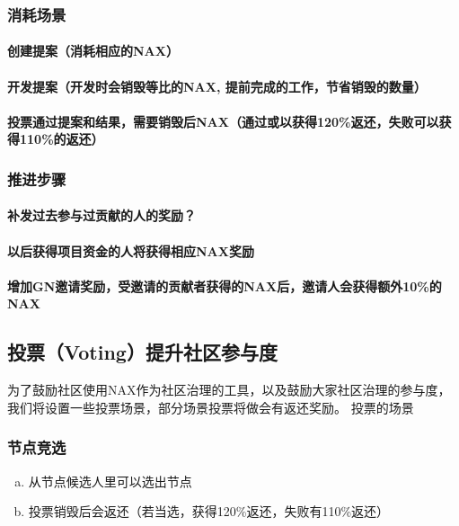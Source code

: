 \subsubsection{消耗场景}
\paragraph{创建提案（消耗相应的NAX）}
\paragraph{开发提案（开发时会销毁等比的NAX, 提前完成的工作，节省销毁的数量）}
\paragraph{投票通过提案和结果，需要销毁后NAX（通过或以获得120\%返还，失败可以获得110\%的返还）}

\subsubsection{推进步骤}
\paragraph{补发过去参与过贡献的人的奖励？}
\paragraph{以后获得项目资金的人将获得相应NAX奖励}
\paragraph{增加GN邀请奖励，受邀请的贡献者获得的NAX后，邀请人会获得额外10\%的NAX}

\subsection{投票（Voting）提升社区参与度}
为了鼓励社区使用NAX作为社区治理的工具，以及鼓励大家社区治理的参与度，我们将设置一些投票场景，部分场景投票将做会有返还奖励。
投票的场景

\subsubsection{节点竞选}
\begin{enumerate}[a.]
  \item 从节点候选人里可以选出节点
  \item 投票销毁后会返还（若当选，获得120\%返还，失败有110\%返还）
\end{enumerate}

